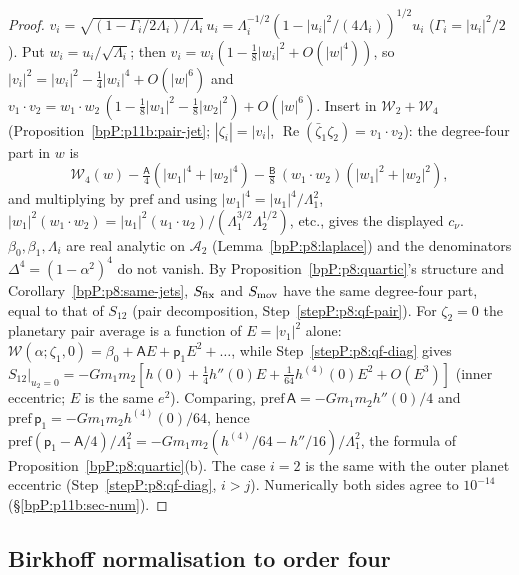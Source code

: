 \begin{proof}
\label{stepP:p11b:qe-conv} $v_i=\sqrt{(1-\Gamma_i/2\Lambda_i)/\Lambda_i}\,u_i=\Lambda_i^{-1/2}(1-|u_i|^2/(4\Lambda_i))^{1/2}u_i$ ($\Gamma_i=|u_i|^2/2$). Put $w_i=u_i/\sqrt{\Lambda_i}$; then $v_i=w_i(1-\tfrac18|w_i|^2+O(|w|^4))$, so $|v_i|^2=|w_i|^2-\tfrac14|w_i|^4+O(|w|^6)$ and $v_1\cdot v_2=w_1\cdot w_2\,(1-\tfrac18|w_1|^2-\tfrac18|w_2|^2)+O(|w|^6)$. Insert in $\mathcal W_2+\mathcal W_4$ (Proposition~\ref{bpP:p11b:pair-jet}; $|\zeta_i|=|v_i|$, $\operatorname{Re}(\bar\zeta_1\zeta_2)=v_1\cdot v_2$): the degree-four part in $w$ is
\[\mathcal W_4(w)-\tfrac{\mathsf A}4(|w_1|^4+|w_2|^4)-\tfrac{\mathsf B}8\,(w_1\cdot w_2)(|w_1|^2+|w_2|^2),\]
and multiplying by $\mathrm{pref}$ and using $|w_1|^4=|u_1|^4/\Lambda_1^2$, $|w_1|^2(w_1\cdot w_2)=|u_1|^2(u_1\cdot u_2)/(\Lambda_1^{3/2}\Lambda_2^{1/2})$, etc., gives the displayed $c_\nu$.
\label{stepP:p11b:qe-an} $\beta_0,\beta_1,\Lambda_i$ are real analytic on $\mathcal A_2$ (Lemma~\ref{bpP:p8:laplace}) and the denominators $\Delta^4=(1-\alpha^2)^4$ do not vanish. By Proposition~\ref{bpP:p8:quartic}'s structure and Corollary~\ref{bpP:p8:same-jets}, $S_{\rm fix}$ and $S_{\rm mov}$ have the same degree-four part, equal to that of $S_{12}$ (pair decomposition, Step~\ref{stepP:p8:qf-pair}).
\label{stepP:p11b:qe-c12} For $\zeta_2=0$ the planetary pair average is a function of $E=|v_1|^2$ alone: $\mathcal W(\alpha;\zeta_1,0)=\beta_0+\mathsf AE+\mathsf p_1E^2+\dots$, while Step~\ref{stepP:p8:qf-diag} gives $S_{12}|_{u_2=0}=-Gm_1m_2[h(0)+\tfrac14h''(0)E+\tfrac1{64}h^{(4)}(0)E^2+O(E^3)]$ (inner eccentric; $E$ is the same $e^2$). Comparing, $\mathrm{pref}\,\mathsf A=-Gm_1m_2h''(0)/4$ and $\mathrm{pref}\,\mathsf p_1=-Gm_1m_2h^{(4)}(0)/64$, hence $\mathrm{pref}(\mathsf p_1-\mathsf A/4)/\Lambda_1^2=-Gm_1m_2(h^{(4)}/64-h''/16)/\Lambda_1^2$, the formula of Proposition~\ref{bpP:p8:quartic}(b). The case $i=2$ is the same with the outer planet eccentric (Step~\ref{stepP:p8:qf-diag}, $i>j$). Numerically both sides agree to $10^{-14}$ (\S\ref{bpP:p11b:sec-num}).
\end{proof}

\subsection{Birkhoff normalisation to order four}\label{bpP:p11b:sec-bnf}

